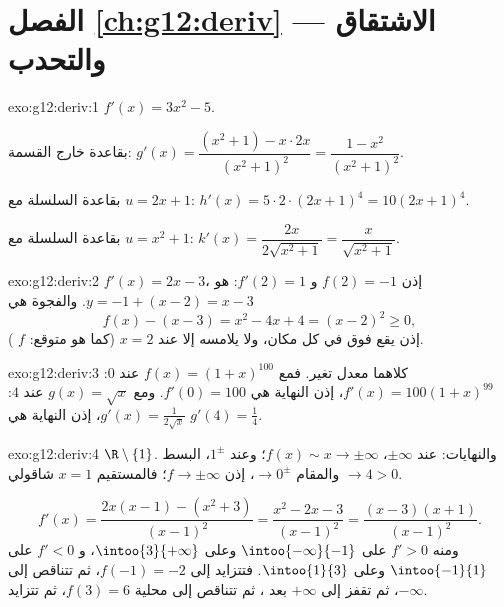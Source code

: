 \section*{الفصل \ref{ch:g12:deriv} --- الاشتقاق والتحدب}

\begin{solution}{exo:g12:deriv:1}
$f'(x) = 3x^2 - 5$.

بقاعدة خارج القسمة:
$g'(x) = \dfrac{(x^2+1) - x\cdot 2x}{(x^2+1)^2} = \dfrac{1 - x^2}{(x^2+1)^2}$.

بقاعدة السلسلة مع $u = 2x+1$: $h'(x) = 5 \cdot 2 \cdot (2x+1)^4 = 10(2x+1)^4$.

بقاعدة السلسلة مع $u = x^2 + 1$:
$k'(x) = \dfrac{2x}{2\sqrt{x^2+1}} = \dfrac{x}{\sqrt{x^2+1}}$.
\end{solution}

\begin{solution}{exo:g12:deriv:2}
$f'(x) = 2x - 3$، إذن $f(2) = -1$ و $f'(2) = 1$:  هو
$y = -1 + (x - 2) = x - 3$. والفجوة هي
\[
f(x) - (x - 3) = x^2 - 4x + 4 = (x-2)^2 \geq 0 ,
\]
إذن يقع  فوق  في كل مكان، ولا يلامسه إلا عند $x = 2$
(كما هو متوقع:  $f$ ).
\end{solution}

\begin{solution}{exo:g12:deriv:3}
كلاهما معدل تغير. فمع $f(x) = (1+x)^{100}$ عند $0$:
$f'(x) = 100(1+x)^{99}$، إذن النهاية هي $f'(0) = 100$.
ومع $g(x) = \sqrt{x}$ عند $4$: $g'(x) = \frac{1}{2\sqrt{x}}$، إذن النهاية هي
$g'(4) = \frac14$.
\end{solution}

\begin{solution}{exo:g12:deriv:4}
 $\R \setminus \{1\}$. والنهايات: عند $\pm\infty$، $f(x) \sim x \to
\pm\infty$؛ وعند $1^\pm$، البسط $\to 4 > 0$ والمقام $\to 0^\pm$،
إذن $f \to \pm\infty$؛ فالمستقيم $x = 1$  شاقولي.

\[
f'(x) = \frac{2x(x-1) - (x^2+3)}{(x-1)^2} = \frac{x^2 - 2x - 3}{(x-1)^2}
= \frac{(x-3)(x+1)}{(x-1)^2}.
\]
ومنه $f' > 0$ على $\intoo{-\infty}{-1}$ وعلى $\intoo{3}{+\infty}$، و $f' < 0$ على
$\intoo{-1}{1}$ وعلى $\intoo{1}{3}$. فتتزايد  إلى 
$f(-1) = -2$، ثم تتناقص إلى $-\infty$، ثم تقفز إلى $+\infty$ بعد ،
ثم تتناقص إلى  محلية $f(3) = 6$، ثم تتزايد.
\end{solution}

